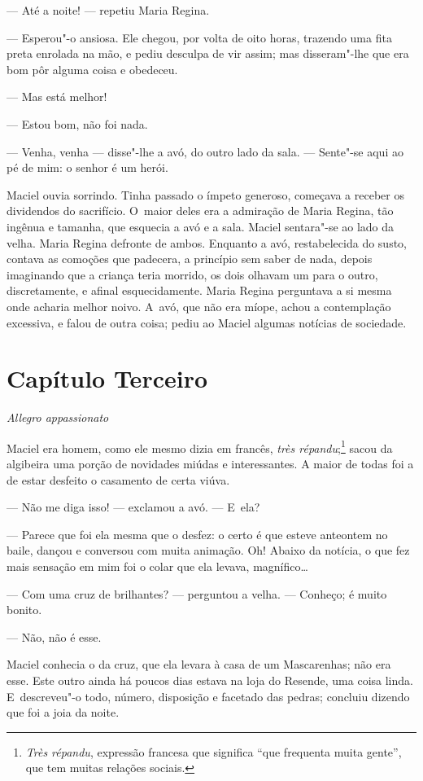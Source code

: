 \begin{linenumbers}
--- Até a noite! --- repetiu Maria Regina.

--- Esperou"-o ansiosa. Ele chegou, por volta de oito horas,
trazendo uma fita preta enrolada na mão, e pediu desculpa de vir assim;
mas disseram"-lhe que era bom pôr alguma coisa e obedeceu.

--- Mas está melhor!

--- Estou bom, não foi nada.

--- Venha, venha --- disse"-lhe a avó, do outro lado da sala.
--- Sente"-se aqui ao pé de mim: o senhor é um herói.

Maciel ouvia sorrindo. Tinha passado o ímpeto generoso, começava a
receber os dividendos do sacrifício. O~maior deles era a admiração de
Maria Regina, tão ingênua e tamanha, que esquecia a avó e a sala. Maciel
sentara"-se ao lado da velha. Maria Regina defronte de ambos. Enquanto a
avó, restabelecida do susto, contava as comoções que padecera, a
princípio sem saber de nada, depois imaginando que a criança teria
morrido, os dois olhavam um para o outro, discretamente, e afinal
esquecidamente. Maria Regina perguntava a si mesma onde acharia melhor
noivo. A~avó, que não era míope, achou a contemplação excessiva, e falou
de outra coisa; pediu ao Maciel algumas notícias de sociedade.

\section{Capítulo Terceiro}

\emph{Allegro appassionato}

Maciel era homem, como ele mesmo dizia em francês, \emph{très
répandu};\footnote{\emph{Très répandu}, expressão francesa que significa
  ``que frequenta muita gente'', que tem muitas relações sociais.}
sacou da algibeira uma porção de novidades miúdas e interessantes. A
maior de todas foi a de estar desfeito o casamento de certa viúva.

--- Não me diga isso! --- exclamou a avó. --- E~ela?

--- Parece que foi ela mesma que o desfez: o certo é que esteve anteontem
no baile, dançou e conversou com muita animação. Oh! Abaixo da notícia,
o que fez mais sensação em mim foi o colar que ela levava, magnífico\ldots{}

--- Com uma cruz de brilhantes? --- perguntou a velha. --- Conheço; é muito
bonito.

--- Não, não é esse.

Maciel conhecia o da cruz, que ela levara à casa de um Mascarenhas; não
era esse. Este outro ainda há poucos dias estava na loja do Resende, uma
coisa linda. E~descreveu"-o todo, número, disposição e facetado das
pedras; concluiu dizendo que foi a joia da noite.


\end{linenumbers}
